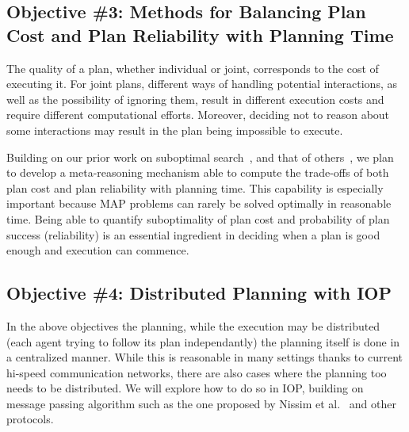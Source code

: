 \documentclass[11pt]{article}
\newcommand{\note}[1]{\textbf{\textit{#1}}}
\begin{document}
 
\subsection{Objective \#3: Methods for Balancing Plan Cost and Plan Reliability with Planning Time}

The quality of a plan, whether individual or joint,  corresponds to the cost of executing it. For joint plans, different ways of handling potential interactions, as well as the possibility of ignoring them, result in different execution costs and require different computational efforts. Moreover, deciding not to reason about some interactions may result in the plan being impossible to execute. 

Building on our prior work on suboptimal search~\cite{barer2014suboptimal-socs,stern2014potential,stern2011probably,stern2012search}, and that of others~\cite{pohl1973avoidance,pearl1982studies,thayer2011bounded}, we plan to develop a meta-reasoning mechanism able to compute the trade-offs of both plan cost and plan reliability with planning time. This capability is especially important because MAP problems can rarely be solved optimally in reasonable time.  Being able to quantify suboptimality of plan cost and probability of plan success (reliability) is an essential ingredient in deciding when a plan is good enough and execution can commence.



\subsection{Objective \#4: Distributed Planning with IOP}
In the above objectives the planning, while the execution may be distributed (each agent trying to follow its plan independantly) the planning itself is done in a centralized manner. While this is reasonable in many settings thanks to current hi-speed communication networks, there are also cases where the planning too needs to be distributed. We will explore how to do so in IOP, building on message passing algorithm such as the one proposed by Nissim et al.~\cite{nissim2014distributed} and other protocols.  


\end{document}
